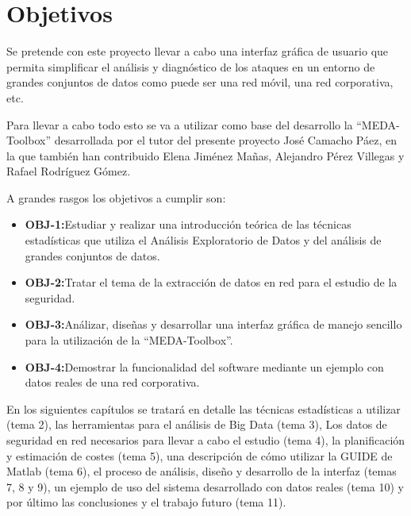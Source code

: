 \section{Objetivos}

Se pretende con este proyecto llevar a cabo una interfaz gráfica de usuario que permita simplificar el análisis y diagnóstico de los ataques en un entorno de grandes conjuntos de datos como puede ser una red móvil, una red corporativa, etc. 
\bigskip

Para llevar a cabo todo esto se va a utilizar como base del desarrollo la “MEDA-Toolbox” desarrollada por el tutor del presente proyecto José Camacho Páez, en la que también han contribuido Elena Jiménez Mañas, Alejandro Pérez Villegas y Rafael Rodríguez Gómez.
\bigskip

A grandes rasgos los objetivos a cumplir son:

\begin{itemize}
	\item \textbf{OBJ-1:}Estudiar y realizar una introducción teórica de las técnicas estadísticas que utiliza el Análisis Exploratorio de Datos y del análisis de grandes conjuntos de datos.
	
	\item \textbf{OBJ-2:}Tratar el tema de la extracción de datos en red para el estudio de la seguridad.
	
	\item \textbf{OBJ-3:}Análizar, diseñas y desarrollar una interfaz gráfica de manejo sencillo para la utilización de la “MEDA-Toolbox”.
	
	\item \textbf{OBJ-4:}Demostrar la funcionalidad del software mediante un ejemplo con datos reales de una red corporativa.
	
\end{itemize}
\bigskip

En los siguientes capítulos se tratará en detalle las técnicas estadísticas a utilizar (tema 2), las herramientas para el análisis de Big Data (tema 3), Los datos de seguridad en red necesarios para llevar a cabo el estudio (tema 4), la planificación y estimación de costes (tema 5), una descripción de cómo  utilizar la GUIDE de Matlab (tema 6), el proceso de análisis, diseño y desarrollo de la interfaz (temas 7, 8 y 9), un ejemplo de uso del sistema desarrollado con datos reales (tema 10) y por último las conclusiones y el trabajo futuro (tema 11).